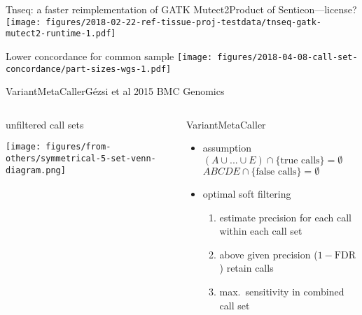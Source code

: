 \documentclass{beamer}
\begin{document}
\begin{frame}{Tnseq: a faster reimplementation of GATK Mutect2}{Product of
Sentieon---license?}
\texttt{[image: figures/2018-02-22-ref-tissue-proj-testdata/tnseq-gatk-mutect2-runtime-1.pdf]}
\end{frame}


\begin{frame}{Lower concordance for common sample}
\texttt{[image: figures/2018-04-08-call-set-concordance/part-sizes-wgs-1.pdf]}
\end{frame}


\begin{frame}{VariantMetaCaller}{G\'ezsi et al 2015 BMC Genomics}

\begin{columns}[t]
\begin{column}{0.4\textwidth}{unfiltered call sets}

\texttt{[image: figures/from-others/symmetrical-5-set-venn-diagram.png]}
\end{column}

\begin{column}{0.6\textwidth}{VariantMetaCaller}
\small
\begin{itemize}
\item<1-> assumption 
\((A\cup ...\cup E) \cap \{\text{true calls\}} = \emptyset\)
\(ABCDE \cap \{\text{false calls\}} = \emptyset\)
\item<1-> optimal \alert{soft} filtering
\begin{enumerate}
\item<1-> estimate precision for each call within each call set %
\item<1-> above given precision (\(1-\mathrm{FDR}\)) retain calls
\item<1-> max.~sensitivity in combined call set
\end{enumerate}
\end{itemize}
\end{column}
\end{columns}
\end{frame}
\end{document}
